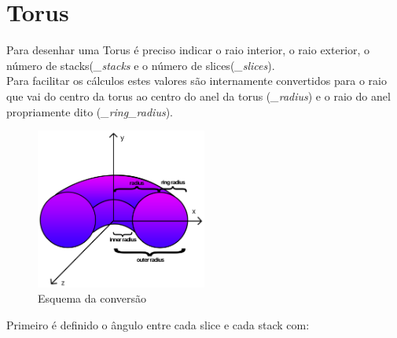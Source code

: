 \documentclass[a4paper]{report}
\begin{document}
\section{Torus}
Para desenhar uma Torus é preciso indicar o raio interior, o raio exterior, o
número de stacks(\textit{\_stacks} e o número de slices(\textit{\_slices}).\\
Para facilitar os cálculos estes valores são internamente convertidos para o
raio que vai do centro da torus ao centro do anel da torus (\textit{\_radius}) e
o raio do anel propriamente dito (\textit{\_ring\_radius}).

\begin{figure}[H]
    \centering 
    \includegraphics[width=0.5\textwidth]{images/torus_conversion.png}
    \caption{Esquema da conversão}
\end{figure}
Primeiro é definido o ângulo entre cada slice e cada stack com:
\end{document}
